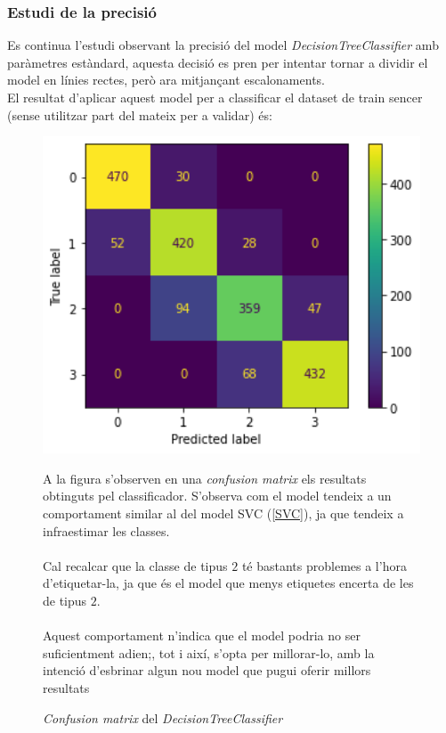 \documentclass[a4paper, 11pt]{article}
\begin{document}
\subsubsection{Estudi de la precisió}
Es continua l'estudi observant la precisió del model \textit{DecisionTreeClassifier} amb paràmetres estàndard, aquesta decisió es pren per intentar tornar a dividir el model en línies rectes, però ara mitjançant escalonaments.\\
El resultat d'aplicar aquest model per a classificar el dataset de train sencer (sense utilitzar part del mateix per a validar) és:
\begin{figure}[h] %
\begin{minipage}{7cm} %
\begin{center}
    \includegraphics[width=1\textwidth]{ConfMatrix/confusionmatrix_decisiontree.png}
    \caption{\textit{Confusion matrix} del \textit{DecisionTreeClassifier}}
\end{center}
\end{minipage} %
\hspace{2em}
\begin{minipage}{7cm} %
A la figura s'observen en una \textit{confusion matrix} els resultats obtinguts pel classificador. S'observa com el model tendeix a un comportament similar al del model SVC (\textcolor{blue}{\ref{SVC}}), ja que tendeix a infraestimar les classes.\\\\
Cal recalcar que la classe de tipus $2$ té bastants problemes a l'hora d'etiquetar-la, ja que és el model que menys etiquetes encerta de les de tipus $2$.\\\\
Aquest comportament n'indica que el model podria no ser suficientment adien;, tot i així, s'opta per millorar-lo, amb la intenció d'esbrinar algun nou model que pugui oferir millors resultats
\end{minipage} %
\end{figure} %
\end{document}

